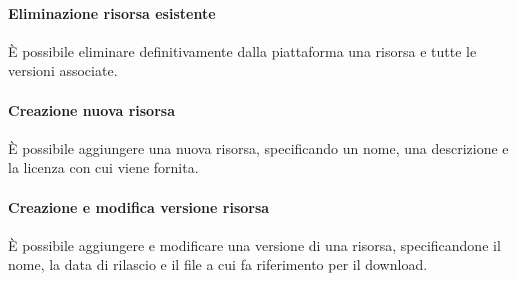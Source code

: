 \paragraph{Eliminazione risorsa esistente}
È possibile eliminare definitivamente dalla piattaforma una risorsa e tutte le
versioni associate.

\paragraph{Creazione nuova risorsa}
È possibile aggiungere una nuova risorsa, specificando un nome, una descrizione
e la licenza con cui viene fornita.

\paragraph{Creazione e modifica versione risorsa}
È possibile aggiungere e modificare una versione di una risorsa, specificandone
il nome, la data di rilascio e il file a cui fa riferimento per il download.